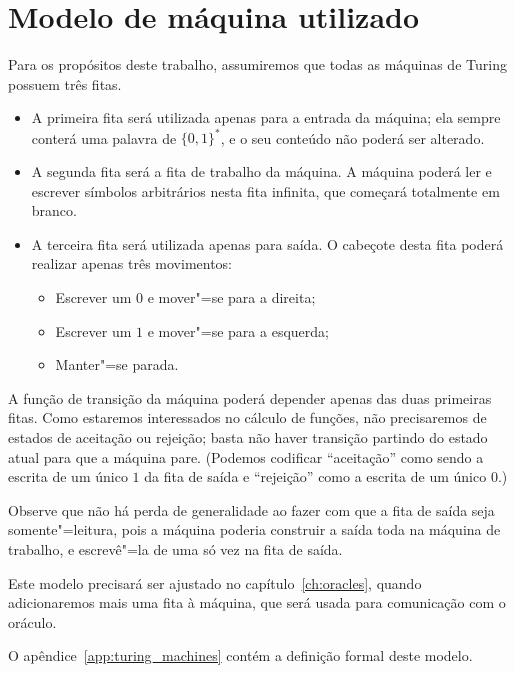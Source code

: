 \section{Modelo de máquina utilizado}

Para os propósitos deste trabalho,
assumiremos que todas as máquinas de Turing possuem três fitas.
\begin{itemize}
    \item A primeira fita será utilizada apenas para a entrada da máquina;
        ela sempre conterá uma palavra de $\{0, 1\}^*$,
        e o seu conteúdo não poderá ser alterado.
    \item A segunda fita será a fita de trabalho da máquina.
        A máquina poderá ler e escrever símbolos arbitrários nesta fita infinita,
        que começará totalmente em branco.
    \item A terceira fita será utilizada apenas para saída.
        O cabeçote desta fita poderá realizar apenas três movimentos:
        \begin{itemize}
            \item Escrever um $0$ e mover"=se para a direita;
            \item Escrever um $1$ e mover"=se para a esquerda;
            \item Manter"=se parada.
        \end{itemize}
\end{itemize}

A função de transição da máquina poderá depender apenas das duas primeiras fitas.
Como estaremos interessados no cálculo de funções,
não precisaremos de estados de aceitação ou rejeição;
basta não haver transição partindo do estado atual para que a máquina pare.
(Podemos codificar ``aceitação'' como sendo a escrita de um único $1$ da fita de saída
e ``rejeição'' como a escrita de um único $0$.)

Observe que não há perda de generalidade
ao fazer com que a fita de saída seja somente"=leitura,
pois a máquina poderia construir a saída toda na máquina de trabalho,
e escrevê"=la de uma só vez na fita de saída.

Este modelo precisará ser ajustado no capítulo~\ref{ch:oracles},
quando adicionaremos mais uma fita à máquina,
que será usada para comunicação com o oráculo.

O apêndice~\ref{app:turing_machines}
contém a definição formal deste modelo.
